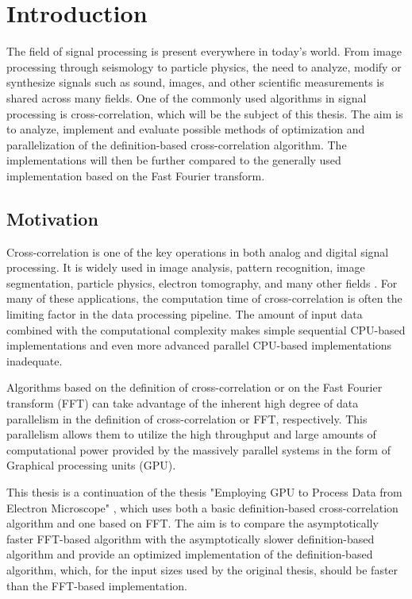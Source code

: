 \chapter*{Introduction}

The field of signal processing is present everywhere in today's world. From image processing through seismology to particle physics, the need to analyze, modify or synthesize signals such as sound, images, and other scientific measurements is shared across many fields. One of the commonly used algorithms in signal processing is cross-correlation, which will be the subject of this thesis. The aim is to analyze, implement and evaluate possible methods of optimization and parallelization of the definition-based cross-correlation algorithm. The implementations will then be further compared to the generally used implementation based on the Fast Fourier transform.

\section*{Motivation}

Cross-correlation is one of the key operations in both analog and digital signal processing.
It is widely used in image analysis, pattern recognition, image segmentation, particle physics, electron tomography, and many other fields \citep{Kapinchev2015}. For many of these applications, the computation time of cross-correlation is often the limiting factor in the data processing pipeline. The amount of input data combined with the computational complexity makes simple sequential CPU-based implementations and even more advanced parallel CPU-based implementations inadequate.

Algorithms based on the definition of cross-correlation or on the Fast Fourier transform (FFT) can take advantage of the inherent high degree of data parallelism in the definition of cross-correlation or FFT, respectively. This parallelism allows them to utilize the high throughput and large amounts of computational power provided by the massively parallel systems in the form of Graphical processing units (GPU).

This thesis is a continuation of the thesis "Employing GPU to Process Data from Electron Microscope" \citep{misko}, which uses both a basic definition-based cross-correlation algorithm and one based on FFT. The aim is to compare the asymptotically faster FFT-based algorithm with the asymptotically slower definition-based algorithm and provide an optimized implementation of the definition-based algorithm, which, for the input sizes used by the original thesis, should be faster than the FFT-based implementation.

